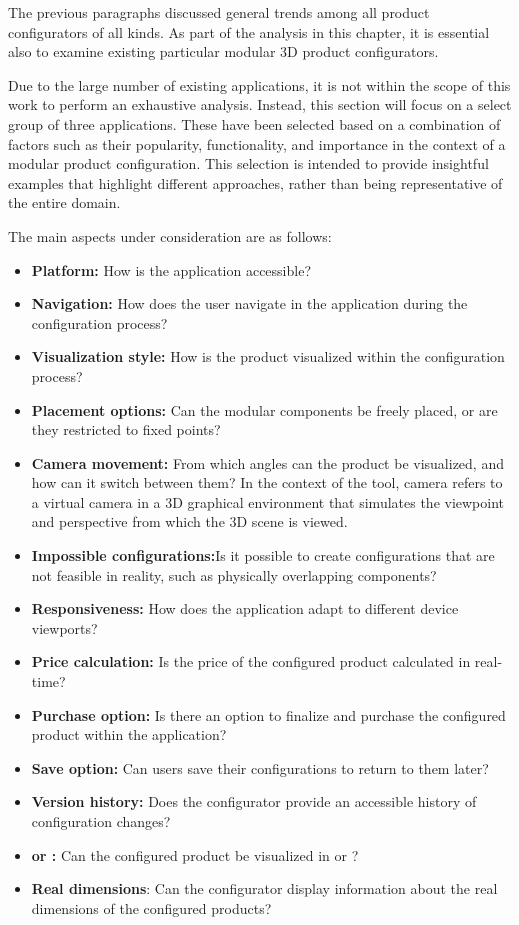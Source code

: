 The previous paragraphs discussed general trends among all product configurators of all kinds. As part of the analysis in this chapter, it is essential also to examine existing particular modular 3D product configurators. 

Due to the large number of existing applications, it is not within the scope of this work to perform an exhaustive analysis. Instead, this section will focus on a select group of three applications. These have been selected based on a combination of factors such as their popularity, functionality, and importance in the context of a modular product configuration. This selection is intended to provide insightful examples that highlight different approaches, rather than being representative of the entire domain.

\noindent The main aspects under consideration are as follows:\nopagebreak
\begin{itemize}[label=\rectanglebullet]
    \item \textbf{Platform:} How is the application accessible?
    \item \textbf{Navigation:} How does the user navigate in the application during the configuration process?
    \item \textbf{Visualization style:} How is the product visualized within the configuration process?
    \item \textbf{Placement options:} Can the modular components be freely placed, or are they restricted to fixed points?
    \item \textbf{Camera movement:} From which angles can the product be visualized, and how can it switch between them? In the context of the tool, camera refers to a virtual camera in a 3D graphical environment that simulates the viewpoint and perspective from which the 3D scene is viewed.
    \item \textbf{Impossible configurations:}Is it possible to create configurations that are not feasible in reality, such as physically overlapping components?
    \item \textbf{Responsiveness:} How does the application adapt to different device viewports?
    \item \textbf{Price calculation:} Is the price of the configured product calculated in real-time?
    \item \textbf{Purchase option:} Is there an option to finalize and purchase the configured product within the application?
    \item \textbf{Save option:} Can users save their configurations to return to them later?
    \item \textbf{Version history:} Does the configurator provide an accessible history of configuration changes?
    \item \textbf{ or :} Can the configured product be visualized in  or ?
    \item \textbf{Real dimensions}: Can the configurator display information about the real dimensions of the configured products? 
\end{itemize}
